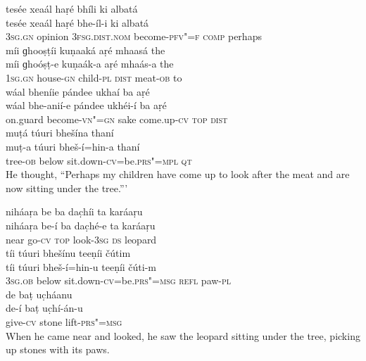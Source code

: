 \begin{exe}
\ex
\label{ex:11}
\glll tesée	xeaál	haṛé	bhíli	ki	albatá \\
tesée	xeaál	haṛé	bhe-íl-i	ki	albatá \\
\textsc{3sg.gn}	opinion \textsc{3fsg.dist.nom}	become-\textsc{pfv"=f} \textsc{comp}	perhaps \\
\glll míi	ɡhooṣṭíi	kuṇaaká	aṛé	mhaasá	the \\
míi	ɡhoóṣṭ-e	kuṇaák-a	aṛé	mhaás-a	the \\
\textsc{1sg.gn}	house-\textsc{gn}	child-\textsc{pl} \textsc{dist}	meat-\textsc{ob}	to \\
\glll wáal	bheníie	pándee	ukhaí	ba	aṛé \\
wáal	bhe-anií-e	pándee	ukhéi-í	ba	aṛé \\
on.guard	become-\textsc{vn"=gn}	sake	come.up-\textsc{cv} \textsc{top} \textsc{dist} \\
\glll muṭá	túuri	bhešína	thaní \\
muṭ-a	túuri	bheš-í=hin-a	thaní \\
tree-\textsc{ob}	below	sit.down-\textsc{cv}=be.\textsc{prs"=mpl} 	\textsc{qt} \\
\glt He thought, “Perhaps my children have come up to look after the meat and are now sitting under the tree.”'

\ex
\label{ex:12}
\glll niháaṛa	be	ba	dac̣híi	ta	karáaṛu \\
niháaṛa	be-í	ba	dac̣hé-e	ta	karáaṛu \\
near	go-\textsc{cv} \textsc{top}	look-\textsc{3sg} \textsc{ds}	leopard \\
\glll tíi	túuri	bhešínu	teeṇíi	čútim \\
tíi	túuri	bheš-í=hin-u	teeṇíi	čúti-m \\
\textsc{3sg.ob}	below	sit.down-\textsc{cv}=be.\textsc{prs"=msg } \textsc{refl}	paw-\textsc{pl} \\
\glll de	baṭ	uc̣háanu \\
de-í	baṭ	uc̣hí-án-u \\
give-\textsc{cv}	stone	lift-\textsc{prs"=msg} \\
\glt When he came near and looked, he saw the leopard sitting under the tree, picking up stones with its paws.


\end{exe}
